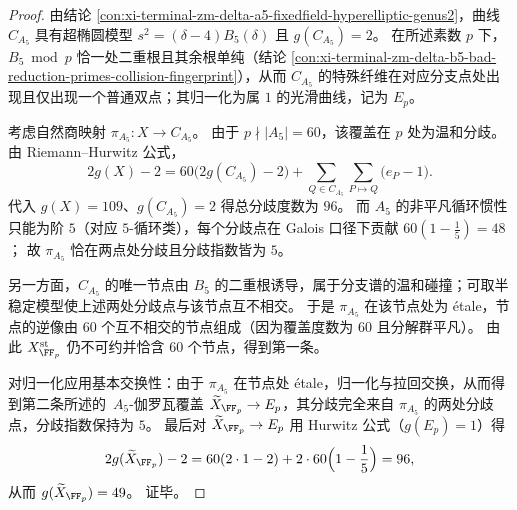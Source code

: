 \begin{proof}
由结论 \ref{con:xi-terminal-zm-delta-a5-fixedfield-hyperelliptic-genus2}，曲线 \(C_{A_5}\) 具有超椭圆模型
\(
s^2=(\delta-4)B_5(\delta)
\)
且 \(g(C_{A_5})=2\)。
在所述素数 \(p\) 下，\(B_5\bmod p\) 恰一处二重根且其余根单纯（结论 \ref{con:xi-terminal-zm-delta-b5-bad-reduction-primes-collision-fingerprint}），从而 \(C_{A_5}\) 的特殊纤维在对应分支点处出现且仅出现一个普通双点；其归一化为属 \(1\) 的光滑曲线，记为 \(E_p\)。
\par
考虑自然商映射 \(\pi_{A_5}:X\to C_{A_5}\)。
由于 \(p\nmid |A_5|=60\)，该覆盖在 \(p\) 处为温和分歧。
由 Riemann--Hurwitz 公式，
\[
2g(X)-2
=60\bigl(2g(C_{A_5})-2\bigr)+\sum_{Q\in C_{A_5}}\sum_{P\mapsto Q}\bigl(e_P-1\bigr).
\]
代入 \(g(X)=109\)、\(g(C_{A_5})=2\) 得总分歧度数为 \(96\)。
而 \(A_5\) 的非平凡循环惯性只能为阶 \(5\)（对应 \(5\)-循环类），每个分歧点在 Galois 口径下贡献
\(
60(1-\frac15)=48
\)；
故 \(\pi_{A_5}\) 恰在两点处分歧且分歧指数皆为 \(5\)。
\par
另一方面，\(C_{A_5}\) 的唯一节点由 \(B_5\) 的二重根诱导，属于分支谱的温和碰撞；可取半稳定模型使上述两处分歧点与该节点互不相交。
于是 \(\pi_{A_5}\) 在该节点处为 \'etale，节点的逆像由 \(60\) 个互不相交的节点组成（因为覆盖度数为 \(60\) 且分解群平凡）。
由此 \(X^{\mathrm{st}}_{\FF_p}\) 仍不可约并恰含 \(60\) 个节点，得到第一条。
\par
对归一化应用基本交换性：由于 \(\pi_{A_5}\) 在节点处 \'etale，归一化与拉回交换，从而得到第二条所述的 \(\,A_5\)-伽罗瓦覆盖 \(\widetilde X_{\FF_p}\to E_p\)，其分歧完全来自 \(\pi_{A_5}\) 的两处分歧点，分歧指数保持为 \(5\)。
最后对 \(\widetilde X_{\FF_p}\to E_p\) 用 Hurwitz 公式（\(g(E_p)=1\)）得
\[
2g(\widetilde X_{\FF_p})-2
=60(2\cdot 1-2)+2\cdot 60\Bigl(1-\frac15\Bigr)
=96,
\]
从而 \(g(\widetilde X_{\FF_p})=49\)。
证毕。
\end{proof}

